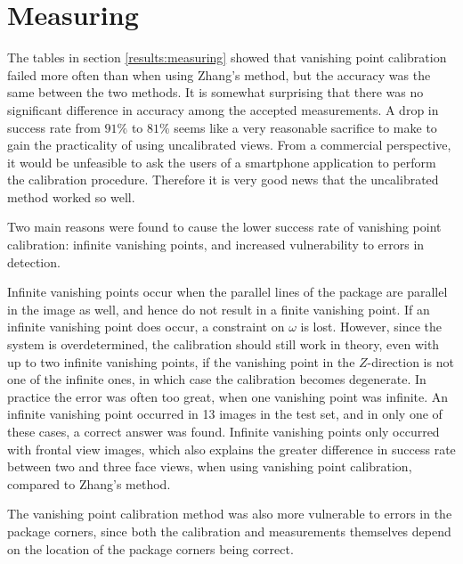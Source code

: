 \section{Measuring}
The tables in section \ref{results:measuring} showed that vanishing point calibration failed more often than when using Zhang's method, but the accuracy was the same between the two methods. %
It is somewhat surprising that there was no significant difference in accuracy among the accepted measurements.
A drop in success rate from $91\%$ to $81\%$ seems like a very reasonable sacrifice to make to gain the practicality of using uncalibrated views.
From a commercial perspective, it would be unfeasible to ask the users of a smartphone application to perform the calibration procedure.
Therefore it is very good news that the uncalibrated method worked so well.

Two main reasons were found to cause the lower success rate of vanishing point calibration: infinite vanishing points, and increased vulnerability to errors in detection.

Infinite vanishing points occur when the parallel lines of the package are parallel in the image as well, and hence do not result in a finite vanishing point. 
If an infinite vanishing point does occur, a constraint on $\omega$ is lost.
However, since the system is overdetermined, the calibration should still work in theory, even with up to two infinite vanishing points, if the vanishing point in the $Z$-direction is not one of the infinite ones, in which case the calibration becomes degenerate.
In practice the error was often too great, when one vanishing point was infinite. 
An infinite vanishing point occurred in 13 images in the test set, and in only one of these cases, a correct answer was found.
Infinite vanishing points only occurred with frontal view images, which also explains the greater difference in success rate between two and three face views, when using vanishing point calibration, compared to Zhang's method.

The vanishing point calibration method was also more vulnerable to errors in the package corners, since both the calibration and measurements themselves depend on the location of the package corners being correct.


